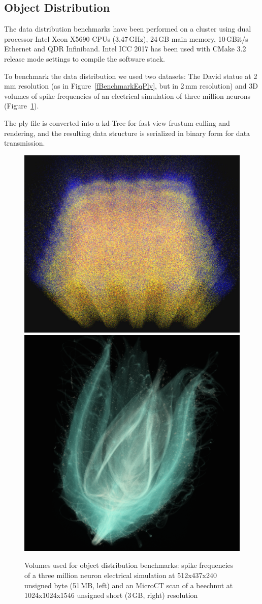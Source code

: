 \documentclass[10pt,journal,compsoc]{IEEEtran}
\newcommand{\fig}[1]{Figure~\ref{#1}}
\begin{document}
\subsection{Object Distribution}

The data distribution benchmarks have been performed on a cluster using
dual processor Intel Xeon X5690 CPUs (3.47\,GHz), 24\,GB main memory, 10\,GBit/s
Ethernet and QDR Infiniband. Intel ICC 2017 has been used with CMake 3.2 release
mode settings to compile the software stack.

To benchmark the data distribution we used two datasets: The David statue at 2\,mm
resolution (as in \fig{fBenchmarkEqPly}, but in 2\,mm resolution) and 3D volumes
of spike frequencies of an electrical simulation of three million neurons
(\fig{fVolumes}).

The ply file is converted into a kd-Tree for fast view frustum culling and
rendering, and the resulting data structure is serialized in binary form for
data transmission.

\begin{figure}[ht]\center
  \includegraphics[height=.44\columnwidth]{images/spikes512}\hfil
  \includegraphics[height=.44\columnwidth]{images/beechnut}
  \caption{\label{fVolumes}Volumes used for object distribution benchmarks:
    spike frequencies of a three million neuron electrical simulation at
    512x437x240 unsigned byte (51\,MB, left) and an MicroCT scan of a beechnut at
    1024x1024x1546 unsigned short (3\,GB, right) resolution}
\end{figure}
\end{document}
